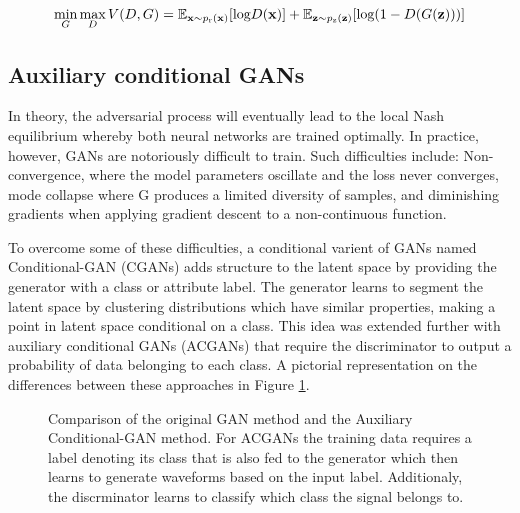 \documentclass[12pt]{iopart}
\begin{document}
\begin{equation}
\mathop{\text{min}}_{G}  \mathop{\text{max}}_{D} V(D,G) = \mathbb{E}_{\mathbf{x} \sim p_{\text{r}}(\mathbf{x})} [\text{log} D(\mathbf{x})] \\ + \mathbb{E}_{\mathbf{z} \sim p_{\text{z}}(\mathbf{z})} [\text{log}(1-D(G(\mathbf{z})))]
\label{equation:GANloss}
\end{equation}
\subsection{Auxiliary conditional GANs}
In theory, the adversarial process will eventually lead to the local Nash equilibrium \cite{Nash1950} whereby
both neural networks are trained optimally. In practice, however, GANs are
notoriously difficult to train. Such difficulties include: Non-convergence,
where the model parameters oscillate and the loss never converges, mode
collapse where G produces a limited diversity of samples, and diminishing
gradients when applying gradient descent to a
non-continuous function. 

To overcome some of these difficulties, a conditional varient of GANs named Conditional-GAN (CGANs) \cite{cgan}
adds structure to the latent space by providing the generator with a class or attribute
label. The generator learns to segment the latent space by clustering distributions which have similar properties, making a point in latent space conditional on a class. This idea was extended further with auxiliary conditional GANs (ACGANs) \cite{odena2016conditional} that require the discriminator to output a
probability of data belonging to each class. A pictorial representation on the differences between these approaches in Figure \ref{fig:gan_comparison}. 

\begin{figure}
    \centering
    \caption{Comparison of the original GAN method and the Auxiliary Conditional-GAN method. For ACGANs the training data requires a label denoting its class that is also fed to the generator which then learns to generate waveforms based on the input label. Additionaly, the discrminator learns to classify which class the signal belongs to.}
    \label{fig:gan_comparison}
\end{figure}

\end{document}
